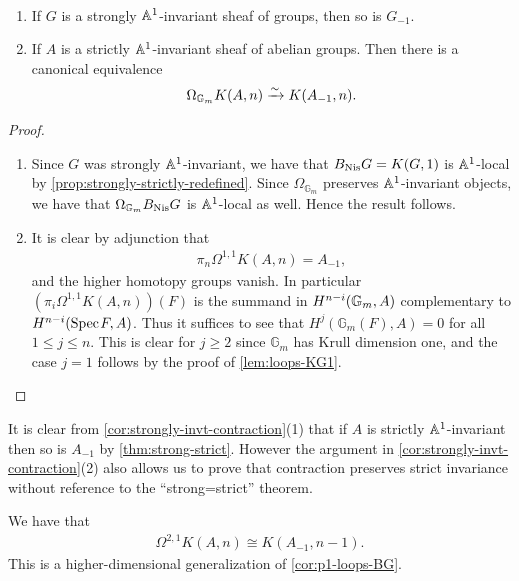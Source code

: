 \documentclass[11pt,openany]{book}
\begin{document}
\begin{corollary}\label{cor:strongly-invt-contraction} \,
\begin{enumerate}
    \item If $G$ is a strongly $\mathbb{A}^1$-invariant sheaf of groups, then so is $G_{-1}$.
    \item If $A$ is a strictly $\mathbb{A}^1$-invariant sheaf of abelian groups. Then there is a canonical equivalence
    \begin{align*}
        \Omega_{\mathbb{G}_m} K(A,n) \xrightarrow{\sim} K(A_{-1},n).
    \end{align*}
\end{enumerate}
\end{corollary}
\begin{proof} $\ $
\begin{enumerate}
    \item Since $G$ was strongly $\mathbb{A}^1$-invariant, we have that $B_{\mathrm{Nis}} G = K(G,1)$ is $\mathbb{A}^1$-local by \autoref{prop:strongly-strictly-redefined}. Since $\Omega_{\mathbb{G}_m}$ preserves $\mathbb{A}^1$-invariant objects, we have that $\Omega_{\mathbb{G}_m}B_{\mathrm{Nis}} G$ is $\mathbb{A}^1$-local as well. Hence the result follows.
    \item It is clear by adjunction that
    \begin{align*}
        \pi_n \Omega^{1,1}K(A,n) = A_{-1},
    \end{align*}
    and the higher homotopy groups vanish. In particular $(\pi_i \Omega^{1,1}K(A,n))(F)$ is the summand in $H^{n-i}(\mathbb{G}_m,A)$ complementary to $H^{n-i}(\text{Spec}\hspace{0.1em} F, A)$. Thus it suffices to see that $H^j(\mathbb{G}_m(F), A) = 0$ for all $1\le j\le n$. This is clear for $j\ge 2$ since $\mathbb{G}_m$ has Krull dimension one, and the case $j=1$ follows by the proof of \autoref{lem:loops-KG1}.
\end{enumerate}
\end{proof}

\begin{remark} 
It is clear from \autoref{cor:strongly-invt-contraction}(1) that if $A$ is strictly $\mathbb{A}^1$-invariant then so is $A_{-1}$ by \autoref{thm:strong-strict}. However the argument in \autoref{cor:strongly-invt-contraction}(2) also allows us to prove that contraction preserves strict invariance without reference to the ``strong=strict'' theorem.
\end{remark}



\begin{corollary} We have that
\begin{align*}
    \Omega^{2,1} K(A,n) \cong K(A_{-1},n-1).
\end{align*}
This is a higher-dimensional generalization of \autoref{cor:p1-loops-BG}.
\end{corollary}
\end{document}
